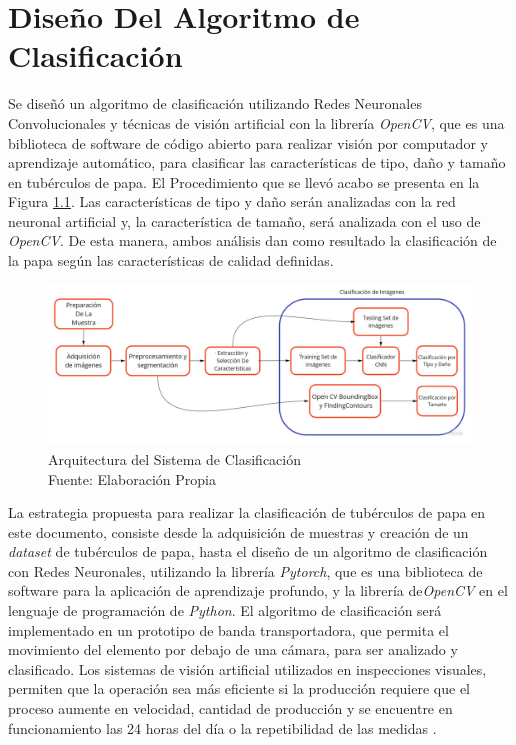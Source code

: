 \chapter{Diseño Del Algoritmo de Clasificación}


Se diseñó un algoritmo de clasificación utilizando Redes Neuronales Convolucionales y técnicas de visión artificial con la librería \textit{OpenCV}, que es una biblioteca de software de código abierto para realizar visión por computador y aprendizaje automático, para clasificar las características de tipo, daño y tamaño en tubérculos de papa. El Procedimiento que se llevó acabo se presenta en la Figura \ref{fig:flujogeneral}. Las características de tipo y daño serán analizadas con la red neuronal artificial y, la característica de tamaño, será analizada con el uso de \textit{OpenCV}. De esta manera, ambos análisis dan como resultado la clasificación de la papa según las características de calidad definidas. \\

\begin{figure}[ht]
	\centering
	\includegraphics[scale=0.28]{Figs/FGGeneral.jpg}
	\caption{Arquitectura del Sistema de Clasificación \\ Fuente: Elaboración Propia}
	\label{fig:flujogeneral}
\end{figure}

La estrategia propuesta para realizar la clasificación de tubérculos de papa en este documento, consiste desde la adquisición de muestras y creación de un \textit{dataset} de tubérculos de papa, hasta el diseño de un algoritmo de clasificación con Redes Neuronales, utilizando la librería \textit{Pytorch}, que es una biblioteca de software para la aplicación de aprendizaje profundo, y la librería de\textit{OpenCV} en el lenguaje de programación de \textit{Python}. El algoritmo de clasificación será implementado en un prototipo de banda transportadora, que permita el movimiento del elemento por debajo de una cámara, para ser analizado y clasificado. Los sistemas de visión artificial utilizados en inspecciones visuales, permiten que la operación sea más eficiente si la producción requiere que el proceso aumente en velocidad, cantidad de producción y se encuentre en funcionamiento las 24 horas del día o la repetibilidad de las medidas \cite{artificial2012aplicacion}.\\

